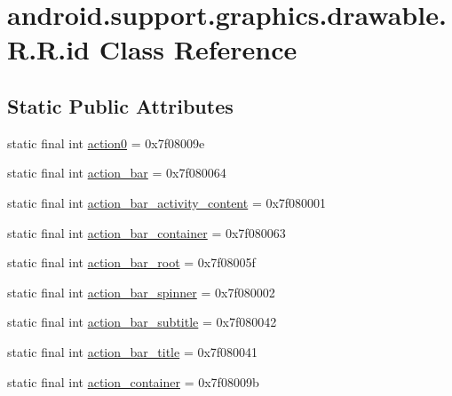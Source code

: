 \hypertarget{classandroid_1_1support_1_1graphics_1_1drawable_1_1_r_1_1id}{
\section{android.support.graphics.drawable.R.R.id Class Reference}
\label{classandroid_1_1support_1_1graphics_1_1drawable_1_1_r_1_1id}
}
\subsection*{Static Public Attributes}
\begin{CompactItemize}
\item 
static final int \hyperlink{classandroid_1_1support_1_1graphics_1_1drawable_1_1_r_1_1id_2886660faab37b05e2c8f936201e5271}{action0} = 0x7f08009e
\item 
static final int \hyperlink{classandroid_1_1support_1_1graphics_1_1drawable_1_1_r_1_1id_618ac727aa9e8825d020e0366722acab}{action\_\-bar} = 0x7f080064
\item 
static final int \hyperlink{classandroid_1_1support_1_1graphics_1_1drawable_1_1_r_1_1id_310bdb0ea743eba47e5ba695f1843b5f}{action\_\-bar\_\-activity\_\-content} = 0x7f080001
\item 
static final int \hyperlink{classandroid_1_1support_1_1graphics_1_1drawable_1_1_r_1_1id_6208819cbc3a8c46236932aa49ec1fa3}{action\_\-bar\_\-container} = 0x7f080063
\item 
static final int \hyperlink{classandroid_1_1support_1_1graphics_1_1drawable_1_1_r_1_1id_7106694835cde8dad5cbb5a0e472a4a2}{action\_\-bar\_\-root} = 0x7f08005f
\item 
static final int \hyperlink{classandroid_1_1support_1_1graphics_1_1drawable_1_1_r_1_1id_16ff1e31fb56e360f2e1f5f41c049aac}{action\_\-bar\_\-spinner} = 0x7f080002
\item 
static final int \hyperlink{classandroid_1_1support_1_1graphics_1_1drawable_1_1_r_1_1id_08acef022cf9939a5d98899d47fa7977}{action\_\-bar\_\-subtitle} = 0x7f080042
\item 
static final int \hyperlink{classandroid_1_1support_1_1graphics_1_1drawable_1_1_r_1_1id_6ea1f3aeb62211643570b7160d010284}{action\_\-bar\_\-title} = 0x7f080041
\item 
static final int \hyperlink{classandroid_1_1support_1_1graphics_1_1drawable_1_1_r_1_1id_47bb5669bb5922383d5c08b2a345d2df}{action\_\-container} = 0x7f08009b
\item 

\end{CompactItemize}
